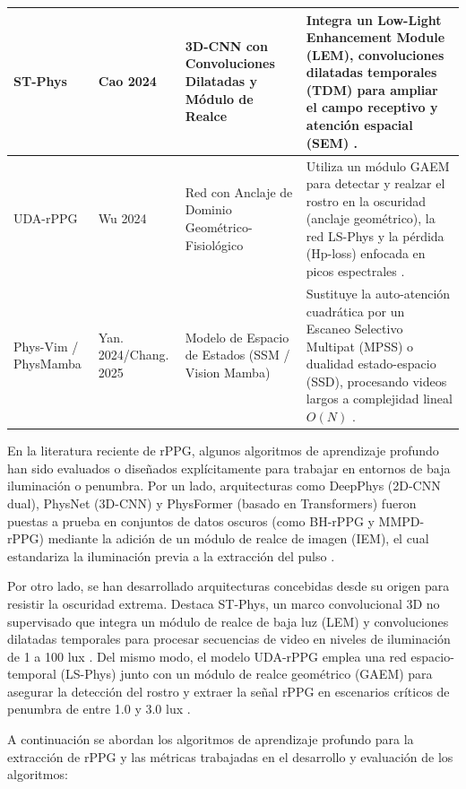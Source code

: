 \begin{longtable}{|p{2.5cm}|p{2.3cm}|p{3.2cm}|p{4.8cm}|}
        ST-Phys                         &  Cao 2024                   & 3D-CNN con Convoluciones Dilatadas y Módulo de Realce                   &  Integra un Low-Light Enhancement Module (LEM), convoluciones dilatadas temporales (TDM) para ampliar el campo receptivo y atención espacial (SEM) \cite{cao2024stphys}. \\ \hline
        UDA-rPPG                        &  Wu 2024                    & Red con Anclaje de Dominio Geométrico-Fisiológico                       &  Utiliza un módulo GAEM para detectar y realzar el rostro en la oscuridad (anclaje geométrico), la red LS-Phys y la pérdida (Hp-loss) enfocada en picos espectrales \cite{wu2026udarppg}.  \\ \hline
        Phys-Vim / PhysMamba            &  Yan. 2024/Chang. 2025      & Modelo de Espacio de Estados (SSM / Vision Mamba)                       &  Sustituye la auto-atención cuadrática por un Escaneo Selectivo Multipat (MPSS) o dualidad estado-espacio (SSD), procesando videos largos a complejidad lineal $O(N)$ \cite{yan2025physmamba, chang2025physvim}.  \\ \hline
\end{longtable}

En la literatura reciente de rPPG, algunos algoritmos de aprendizaje profundo han sido evaluados o diseñados explícitamente para trabajar en entornos de 
baja iluminación o penumbra. Por un lado, arquitecturas como DeepPhys (2D-CNN dual), PhysNet (3D-CNN) y PhysFormer 
(basado en Transformers) fueron puestas a prueba en conjuntos de datos oscuros (como BH-rPPG y MMPD-rPPG) mediante la adición de un módulo de realce de 
imagen (IEM), el cual estandariza la iluminación previa a la extracción del pulso \cite{yang2022image_en}.

Por otro lado, se han desarrollado arquitecturas concebidas desde su origen para resistir la oscuridad extrema. Destaca ST-Phys, un marco convolucional 
3D no supervisado que integra un módulo de realce de baja luz (LEM) y convoluciones dilatadas temporales para procesar secuencias de video en niveles 
de iluminación de 1 a 100 lux \cite{cao2024stphys}. Del mismo modo, el modelo UDA-rPPG emplea una red espacio-temporal (LS-Phys) junto con un módulo de realce 
geométrico (GAEM) para asegurar la detección del rostro y extraer la señal rPPG en escenarios críticos de penumbra de entre 1.0 y 3.0 lux \cite{wu2026udarppg}.


A continuación se abordan los algoritmos de aprendizaje profundo para la extracción de rPPG y las métricas trabajadas en el desarrollo y evaluación de los
algoritmos:

